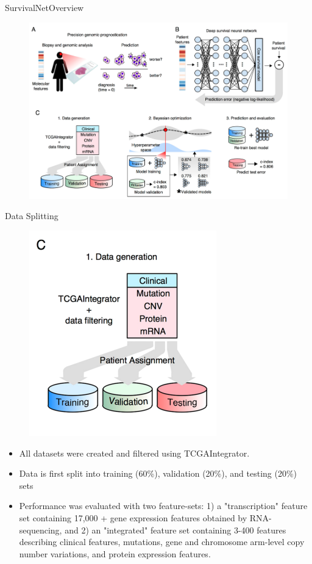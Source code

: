 \documentclass[
]{beamer}
\begin{document}
	\begin{frame}[plain]{SurvivalNet}{Overview}
		\begin{figure}
			\centering
			\includegraphics[scale=0.45]{snover}
		\end{figure}
	\end{frame}
	
	
	\begin{frame}[plain]{Data Splitting}
		\begin{figure}
			\centering
			\includegraphics[scale=0.4]{split}
		\end{figure}
		\begin{itemize}
			\item All datasets were created and filtered using TCGAIntegrator.
			\item Data is first split into training (60\%), validation (20\%), and
			testing (20\%) sets
			\item Performance was evaluated
			with two feature-sets: 1) a "transcription" feature set containing 17,000 + gene expression features obtained
			by RNA-sequencing, and 2) an "integrated" feature set containing 3-400 features describing clinical features,
			mutations, gene and chromosome arm-level copy number variations, and protein expression features.
		\end{itemize}
	\end{frame}
	
\end{document}
